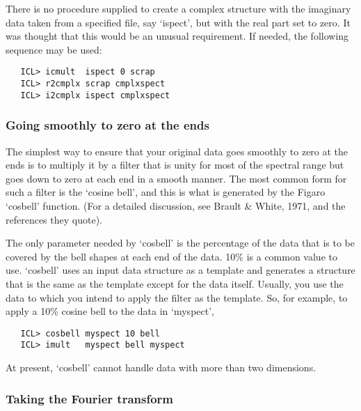    There is no procedure supplied to create a complex structure with
   the imaginary data taken from a specified file, say `ispect', but
   with the real part set to zero.  It was thought that this would be an
   unusual requirement.  If needed, the following sequence may be used:

\begin{verbatim}
   ICL> icmult  ispect 0 scrap
   ICL> r2cmplx scrap cmplxspect
   ICL> i2cmplx ispect cmplxspect
\end{verbatim}


\subsubsection{\label{techno6zeroedge}Going smoothly to zero at the ends}

   The simplest way to ensure that your original data goes smoothly
   to zero at the ends is to multiply it by a filter that is unity for
   most of the spectral range but goes down to zero at each end in a
   smooth manner.  The most common form for such a filter is the `cosine
   bell', and this is what is generated by the Figaro `cosbell'
   function.  (For a detailed discussion, see Brault \& White, 1971,
   and the references they quote).

   The only parameter needed by `cosbell' is the percentage of the data
   that is to be covered by the bell shapes at each end of the data.
   10\% is a common value to use.  `cosbell' uses an input data structure
   as a template and generates a structure that is the same as the
   template except for the data itself.  Usually, you use the data to
   which you intend to apply the filter as the template.  So, for
   example, to apply a 10\% cosine bell to the data in `myspect',

\begin{verbatim}
   ICL> cosbell myspect 10 bell
   ICL> imult   myspect bell myspect
\end{verbatim}

   At present, `cosbell' cannot handle data with more than two dimensions.


\subsubsection{\label{techno6dofft}Taking the Fourier transform}

